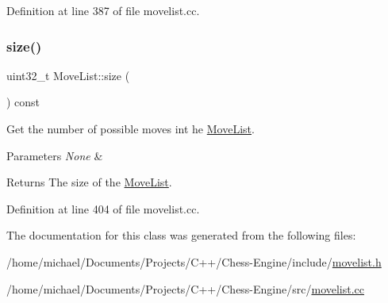 Definition at line 387 of file movelist.\+cc.

\mbox{\label{classMoveList_a4975d53e1bca9fde5bbc9d02242f18e7}} 
\subsubsection{\texorpdfstring{size()}{size()}}
{\footnotesize\ttfamily uint32\+\_\+t Move\+List\+::size (\begin{DoxyParamCaption}{ }\end{DoxyParamCaption}) const\hspace{0.3cm}{\ttfamily [noexcept]}}



Get the number of possible moves int he \mbox{\hyperlink{classMoveList}{Move\+List}}. 


\begin{DoxyParams}{Parameters}
{\em None} & \\
\hline
\end{DoxyParams}
\begin{DoxyReturn}{Returns}
The size of the \mbox{\hyperlink{classMoveList}{Move\+List}}. 
\end{DoxyReturn}


Definition at line 404 of file movelist.\+cc.



The documentation for this class was generated from the following files\+:\begin{DoxyCompactItemize}
\item 
/home/michael/\+Documents/\+Projects/\+C++/\+Chess-\/\+Engine/include/\mbox{\hyperlink{movelist_8h}{movelist.\+h}}\item 
/home/michael/\+Documents/\+Projects/\+C++/\+Chess-\/\+Engine/src/\mbox{\hyperlink{movelist_8cc}{movelist.\+cc}}\end{DoxyCompactItemize}
